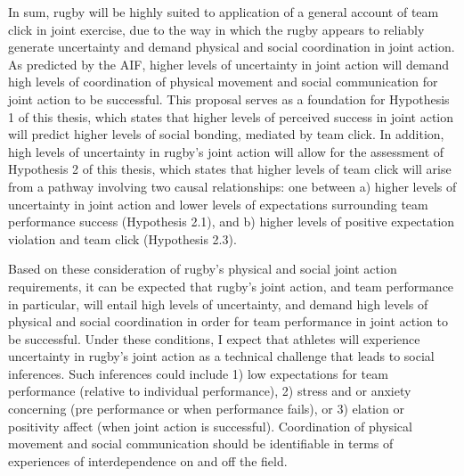 \begin{CJK}{UTF8}{gbsn}
In sum, rugby will be highly suited to application of a general account of team click in joint exercise, due to the way in which the rugby appears to reliably generate uncertainty and demand physical and social coordination in joint action.  As predicted by the AIF, higher levels of uncertainty in joint action will demand high levels of coordination of physical movement and social communication for joint action to be successful.  This proposal serves as a foundation for Hypothesis 1 of this thesis, which states that higher levels of perceived success in joint action will predict higher levels of social bonding, mediated by team click.  In addition, high levels of uncertainty in rugby’s joint action will allow for the assessment of Hypothesis 2 of this thesis, which states that higher levels of team click will arise from a pathway involving two causal relationships: one between a) higher levels of uncertainty in joint action and lower levels of expectations surrounding team performance success (Hypothesis 2.1), and b) higher levels of positive expectation violation and team click (Hypothesis 2.3).

Based on these consideration of rugby’s physical and social joint action requirements, it can be expected that rugby's joint action, and team performance in particular, will entail high levels of uncertainty, and demand high levels of physical and social coordination in order for team performance in joint action to be successful.  Under these conditions, I expect that athletes will experience uncertainty in rugby’s joint action as a technical challenge that leads to social inferences.  Such inferences could include 1) low expectations for team performance (relative to individual performance), 2) stress and or anxiety concerning (pre performance or when performance fails), or 3) elation or positivity affect (when joint action is successful).  Coordination of physical movement and social communication should be identifiable in terms of experiences of interdependence on and off the field.




\end{CJK}
